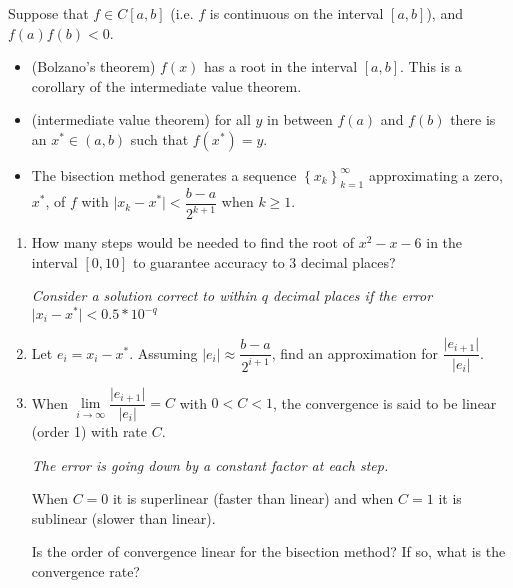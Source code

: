 \documentclass[12pt,letterpaper,noanswers]{exam}
\begin{document}
\begin{tcolorbox}
Suppose that $f\in C[a,b]$ (i.e. $f$ is continuous on the interval $[a,b]$), and $f(a)f(b)<0$.
\begin{itemize}
\itemsep0pt
    \item (Bolzano's theorem) $f(x)$ has a root in the interval $[a,b]$.  This is a corollary of the intermediate value theorem.
    \end{itemize}
\end{tcolorbox}
\begin{tcolorbox}
\begin{itemize}
    \item (intermediate value theorem) for all $y$ in between $f(a)$ and $f(b)$ there is an $x^*\in(a,b)$ such that $f(x^*) = y$.

    \item The bisection method generates a sequence $\left\{x_k\right\}_{k=1}^\infty$ approximating a zero, $x^*$, of $f$ with $\vert x_k - x^*\vert < \dfrac{b-a}{2^{k+1}}$ when $k\geq 1$.
\end{itemize}
\end{tcolorbox}
\begin{enumerate}[resume=classQ]
    \item How many steps would be needed to find the root of $x^2-x-6$ in the interval $[0,10]$ to guarantee accuracy to $3$ decimal places?  
    


\emph{Consider a solution correct to within $q$ decimal places if the error $\vert x_i - x^*\vert < 0.5*10^{-q}$}
\vspace{1in}


    \item Let $e_i = x_i - x^*$.  Assuming $\vert e_i \vert \approx\dfrac{b-a}{2^{i+1}}$, find an approximation for $\dfrac{ \vert e_{i+1} \vert}{ \vert e_i \vert}.$
        \vspace{1in}
        
    \item When $\lim\limits_{i\rightarrow\infty} \dfrac{ \vert e_{i+1} \vert}{ \vert e_i \vert} = C$ with $0<C<1$, the convergence is said to be linear (order 1) with rate $C$.  
    
    \emph{The error is going down by a constant factor at each step.}
    
    When $C = 0$ it is superlinear (faster than linear) and when $C = 1$ it is sublinear (slower than linear).  

Is the order of convergence linear for the bisection method?  If so, what is the convergence rate?


\vspace{0.5in}

\end{enumerate}
\end{document}
